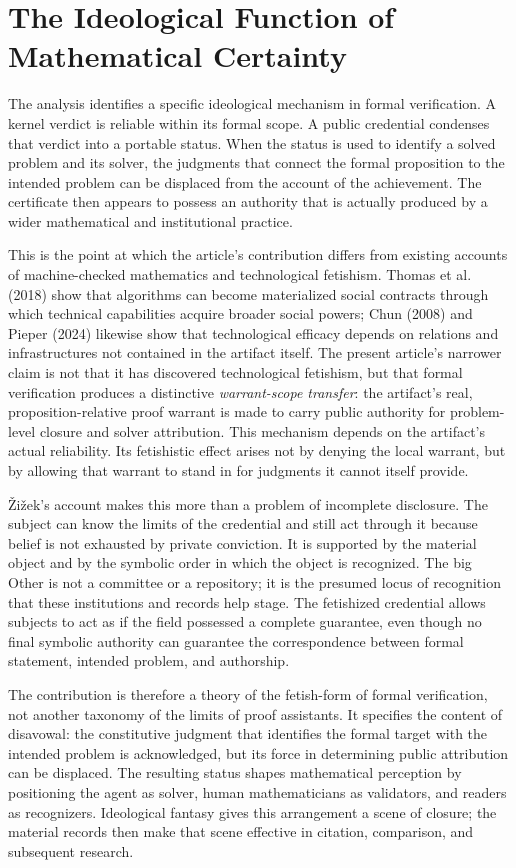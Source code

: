 \documentclass[pdflatex,sn-apa]{sn-jnl}
\begin{document}
\section{The Ideological Function of Mathematical Certainty}

The analysis identifies a specific ideological mechanism in formal verification. A kernel verdict is reliable within its formal scope. A public credential condenses that verdict into a portable status. When the status is used to identify a solved problem and its solver, the judgments that connect the formal proposition to the intended problem can be displaced from the account of the achievement. The certificate then appears to possess an authority that is actually produced by a wider mathematical and institutional practice.

This is the point at which the article's contribution differs from existing accounts of machine-checked mathematics and technological fetishism. Thomas et al. (2018) show that algorithms can become materialized social contracts through which technical capabilities acquire broader social powers; Chun (2008) and Pieper (2024) likewise show that technological efficacy depends on relations and infrastructures not contained in the artifact itself. The present article's narrower claim is not that it has discovered technological fetishism, but that formal verification produces a distinctive \emph{warrant-scope transfer}: the artifact's real, proposition-relative proof warrant is made to carry public authority for problem-level closure and solver attribution. This mechanism depends on the artifact's actual reliability. Its fetishistic effect arises not by denying the local warrant, but by allowing that warrant to stand in for judgments it cannot itself provide.


Žižek's account makes this more than a problem of incomplete disclosure. The subject can know the limits of the credential and still act through it because belief is not exhausted by private conviction. It is supported by the material object and by the symbolic order in which the object is recognized. The big Other is not a committee or a repository; it is the presumed locus of recognition that these institutions and records help stage. The fetishized credential allows subjects to act as if the field possessed a complete guarantee, even though no final symbolic authority can guarantee the correspondence between formal statement, intended problem, and authorship.

The contribution is therefore a theory of the fetish-form of formal verification, not another taxonomy of the limits of proof assistants. It specifies the content of disavowal: the constitutive judgment that identifies the formal target with the intended problem is acknowledged, but its force in determining public attribution can be displaced. The resulting status shapes mathematical perception by positioning the agent as solver, human mathematicians as validators, and readers as recognizers. Ideological fantasy gives this arrangement a scene of closure; the material records then make that scene effective in citation, comparison, and subsequent research.
\end{document}
